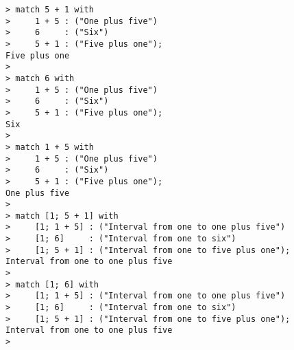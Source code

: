 \begin{center}\begin{minipage}{15cm}\begin{Verbatim}[frame=single]
> match 5 + 1 with 
>     1 + 5 : ("One plus five")
>     6     : ("Six")
>     5 + 1 : ("Five plus one");
Five plus one
> 
> match 6 with 
>     1 + 5 : ("One plus five")
>     6     : ("Six")
>     5 + 1 : ("Five plus one");
Six
>   
> match 1 + 5 with 
>     1 + 5 : ("One plus five")
>     6     : ("Six")
>     5 + 1 : ("Five plus one");
One plus five
> 
> match [1; 5 + 1] with
>     [1; 1 + 5] : ("Interval from one to one plus five")
>     [1; 6]     : ("Interval from one to six")
>     [1; 5 + 1] : ("Interval from one to five plus one");
Interval from one to one plus five
> 
> match [1; 6] with
>     [1; 1 + 5] : ("Interval from one to one plus five")
>     [1; 6]     : ("Interval from one to six")
>     [1; 5 + 1] : ("Interval from one to five plus one");
Interval from one to one plus five
> 
\end{Verbatim}
\end{minipage}\end{center}
